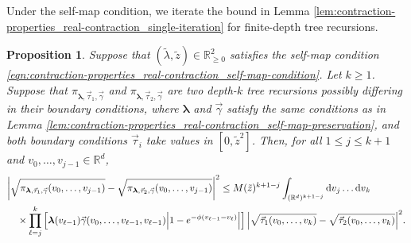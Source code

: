 \documentclass[11pt]{article}
\newcommand{\R}{\mathbb R}
\newcommand{\bl}{\bm{\lambda}}
\newcommand{\tz}{\tilde{z}}
\numberwithin{equation}{section}
\theoremstyle{plain}
\newtheorem{proposition}[theorem]{Proposition}
\theoremstyle{definition}
\theoremstyle{remark}
\begin{document}
Under the self-map condition, we iterate the bound in Lemma \ref{lem:contraction-properties_real-contraction_single-iteration} for finite-depth tree recursions.

\begin{proposition}
\label{prop:contraction-properties_real-contraction_multiple-iteration}
Suppose that $(\tilde{\lambda},\tilde{z})\in\R_{\ge 0}^{2}$ satisfies the self-map condition \eqref{eqn:contraction-properties_real-contraction_self-map-condition}.
Let $k\ge 1$.
Suppose that $\pi_{\bl,\vec{\tau}_{1},\vec{\gamma}}$ and $\pi_{\bl,\vec{\tau}_{2},\vec{\gamma}}$ are two depth-$k$ tree recursions possibly differing in their boundary conditions, where $\bl$ and $\vec{\gamma}$ satisfy the same conditions as in Lemma \ref{lem:contraction-properties_real-contraction_self-map-preservation}, and both boundary conditions $\vec{\tau}_{i}$ take values in $[0,\tz^{2}]$.
Then, for all $1\le j\le k+1$ and $v_{0},\dots,v_{j-1}\in\R^{d}$,
\begin{equation}
\label{eqn:contraction-properties_real-contraction_multiple-iteration}
\begin{multlined}
\abs{\sqrt{\pi_{\bl,\vec{\tau}_{1},\vec{\gamma}}(v_{0},\dots,v_{j-1})}
-\sqrt{\pi_{\bl,\vec{\tau}_{2},\vec{\gamma}}(v_{0},\dots,v_{j-1})}}^{2}
\le M(\tilde{z})^{k+1-j}\int_{(\R^{d})^{k+1-j}}\dd{v}_{j}\dots\dd{v}_{k}
\\
\times \prod_{\ell=j}^{k}\left[\bl(v_{\ell-1})\vec{\gamma}(v_{0},\dots,v_{\ell-1},v_{\ell-1})\vphantom{\abs{1-e^{-\phi(v_{\ell-1}-v_{\ell})}}}\abs{1-e^{-\phi(v_{\ell-1}-v_{\ell})}}\right]
\abs{\sqrt{\vec{\tau}_{1}(v_{0},\dots,v_{k})}-\sqrt{\vec{\tau}_{2}(v_{0},\dots,v_{k})}}^{2}.
\end{multlined}
\end{equation}
\end{proposition}
\end{document}
